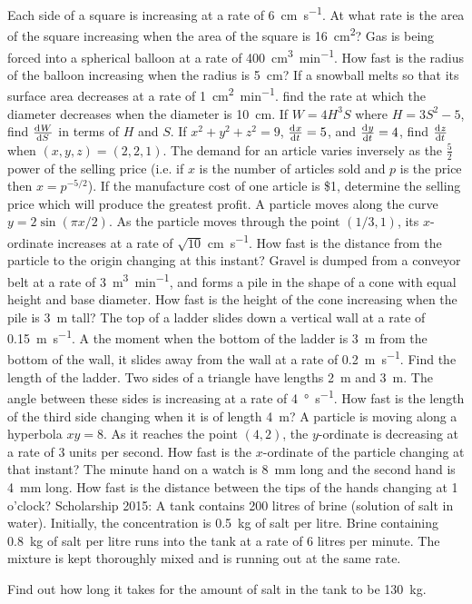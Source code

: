 \begin{questions}
  \questioM Each side of a square is increasing at a rate of \SI{6}{\centi\metre\per\second}. At what rate is the
            area of the square increasing when the area of the square is \SI{16}{\centi\metre\squared}?
  \questioM Gas is being forced into a spherical balloon at a rate of \SI{400}{\centi\metre\cubed\per\minute}. How fast
            is the radius of the balloon increasing when the radius is \SI{5}{\centi\metre}?
  \questioM If a snowball melts so that its surface area decreases at a rate of \SI{1}{\centi\metre\squared\per\minute}.
            find the rate at which the diameter decreases when the diameter is \SI{10}{\centi\metre}.
  \questioM If $ W = 4H^3 S $ where $ H = 3S^2 - 5 $, find $ \od{W}{S} $ in terms of $ H $ and $ S $.
  \questioM If $ x^2 + y^2 + z^2 = 9 $, $ \od{x}{t} = 5 $, and $ \od{y}{t} = 4 $, find $ \od{z}{t} $ when $ (x,y,z) = (2,2,1) $.
  \questioE The demand for an article varies inversely as the $ \frac{5}{2} $ power of the selling price (i.e. if $ x $ is
            the number of articles sold and $ p $ is the price then $ x = p^{-5/2} $). If the manufacture cost of one
            article is \$1, determine the selling price which will produce the greatest profit.
  \questioE A particle moves along the curve $ y = 2\sin(\pi x/2) $. As the particle moves through the point $ (1/3, 1) $,
            its $ x$-ordinate increases at a rate of $ \sqrt{10} $ \si{\centi\metre\per\second}. How fast is the distance
            from the particle to the origin changing at this instant?
  \questioM Gravel is dumped from a conveyor belt at a rate of \SI{3}{\metre\cubed\per\minute}, and forms a pile in the shape
            of a cone with equal height and base diameter. How fast is the height of the cone increasing when the pile is \SI{3}{\metre}
            tall?
  \questioM The top of a ladder slides down a vertical wall at a rate of \SI{0.15}{\metre\per\second}. A the moment when the bottom
            of the ladder is \SI{3}{\metre} from the bottom of the wall, it slides away from the wall at a rate of \SI{0.2}{\metre\per\second}.
            Find the length of the ladder.
  \questioM Two sides of a triangle have lengths \SI{2}{\metre} and \SI{3}{\metre}. The angle between these sides is increasing
            at a rate of \SI{4}{\degree\per\second}. How fast is the length of the third side changing when it is of length \SI{4}{\metre}?
  \questioE A particle is moving along a hyperbola $ xy = 8 $. As it reaches the point $ (4, 2) $, the $ y$-ordinate is decreasing
            at a rate of 3 units per second. How fast is the $ x$-ordinate of the particle changing at that instant?
  \questioE The minute hand on a watch is \SI{8}{\milli\metre} long and the second hand is \SI{4}{\milli\metre} long. How fast is
            the distance between the tips of the hands changing at 1 o'clock?
  \questioS Scholarship 2015: A tank contains 200 litres of brine (solution of salt in water). Initially, the concentration is \SI{0.5}{\kilo\gram}
            of salt per litre. Brine containing \SI{0.8}{\kilo\gram} of salt per litre runs into the tank at a rate of 6 litres per
            minute. The mixture is kept thoroughly mixed and is running out at the same rate.

            Find out how long it takes for the amount of salt in the tank to be \SI{130}{\kilo\gram}.
\end{questions}


